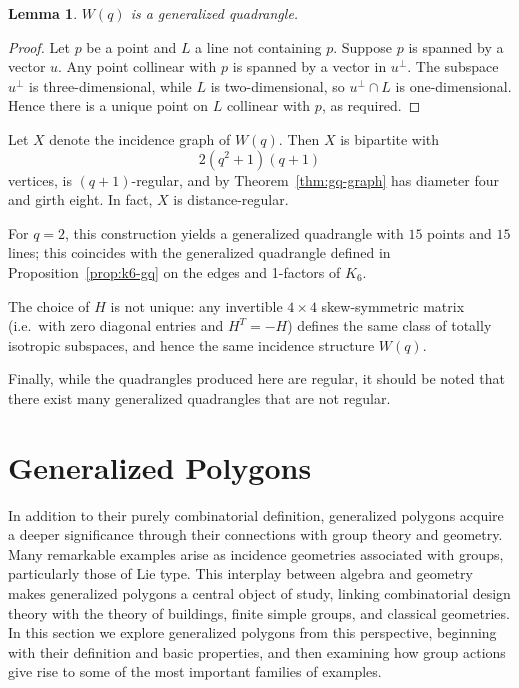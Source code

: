\documentclass[12pt,a4paper,openany]{book}
\newtheorem{lemma}{Lemma}[section]
\begin{document}
\begin{lemma}\label{lem:wq-is-gq}
$W(q)$ is a generalized quadrangle.
\end{lemma}

\begin{proof}
Let $p$ be a point and $L$ a line not containing $p$. Suppose $p$ is spanned by a vector $u$. Any point collinear with $p$ is spanned by a vector in $u^\perp$. The subspace $u^\perp$ is three-dimensional, while $L$ is two-dimensional, so $u^\perp \cap L$ is one-dimensional. Hence there is a unique point on $L$ collinear with $p$, as required.
\end{proof}

Let $X$ denote the incidence graph of $W(q)$. Then $X$ is bipartite with
\[
2(q^2+1)(q+1)
\]
vertices, is $(q+1)$-regular, and by Theorem~\ref{thm:gq-graph} has diameter four and girth eight. In fact, $X$ is distance-regular.

For $q=2$, this construction yields a generalized quadrangle with $15$ points and $15$ lines; this coincides with the generalized quadrangle defined in Proposition~\ref{prop:k6-gq} on the edges and 1-factors of $K_6$.

The choice of $H$ is not unique: any invertible $4\times 4$ skew-symmetric matrix (i.e.\ with zero diagonal entries and $H^T = -H$) defines the same class of totally isotropic subspaces, and hence the same incidence structure $W(q)$.

Finally, while the quadrangles produced here are regular, it should be noted that there exist many generalized quadrangles that are not regular.



\section{Generalized Polygons}

In addition to their purely combinatorial definition, generalized polygons acquire a deeper significance through their connections with group theory and geometry. Many remarkable examples arise as incidence geometries associated with groups, particularly those of Lie type. This interplay between algebra and geometry makes generalized polygons a central object of study, linking combinatorial design theory with the theory of buildings, finite simple groups, and classical geometries. In this section we explore generalized polygons from this perspective, beginning with their definition and basic properties, and then examining how group actions give rise to some of the most important families of examples.
\end{document}
